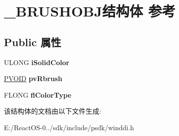 \hypertarget{struct___b_r_u_s_h_o_b_j}{}\section{\+\_\+\+B\+R\+U\+S\+H\+O\+B\+J结构体 参考}
\label{struct___b_r_u_s_h_o_b_j}
\subsection*{Public 属性}
\begin{DoxyCompactItemize}
\item 
\mbox{\label{struct___b_r_u_s_h_o_b_j_a47b538ea5c36a4ca985841ca2f53fa27}} 
U\+L\+O\+NG {\bfseries i\+Solid\+Color}
\item 
\mbox{\label{struct___b_r_u_s_h_o_b_j_a67075e33dcb5b3ba54cc1db31c0bf50d}} 
\hyperlink{interfacevoid}{P\+V\+O\+ID} {\bfseries pv\+Rbrush}
\item 
\mbox{\label{struct___b_r_u_s_h_o_b_j_ab6580b4402f80c3c2f9e6e63b879195a}} 
F\+L\+O\+NG {\bfseries fl\+Color\+Type}
\end{DoxyCompactItemize}


该结构体的文档由以下文件生成\+:\begin{DoxyCompactItemize}
\item 
E\+:/\+React\+O\+S-\/0../sdk/include/psdk/winddi.\+h\end{DoxyCompactItemize}
